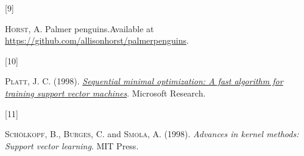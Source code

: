 \documentclass[
  11pt,
  letterpaper,
]{scrbook}
\newlength{\cslhangindent}
\newlength{\csllabelwidth}
\newlength{\cslentryspacingunit} %
\newenvironment{CSLReferences}[2] %
 {%
  \setlength{\parindent}{0pt}
  \ifodd #1
  \let\oldpar\par
  \def\par{\hangindent=\cslhangindent\oldpar}
  \fi
  \setlength{\parskip}{#2\cslentryspacingunit}
 }%
 {}
\newcommand{\CSLLeftMargin}[1]{\parbox[t]{\csllabelwidth}{#1}}
\newcommand{\CSLRightInline}[1]{\parbox[t]{\linewidth - \csllabelwidth}{#1}\break}
\theoremstyle{plain}
\theoremstyle{remark}
\begin{document}
\begin{CSLReferences}{0}{0}
\leavevmode{}%
\CSLLeftMargin{{[}9{]} }%
\CSLRightInline{\textsc{Horst}, A. Palmer penguins.Available at
\url{https://github.com/allisonhorst/palmerpenguins}.}

\leavevmode{}%
\CSLLeftMargin{{[}10{]} }%
\CSLRightInline{\textsc{Platt}, J. C. (1998).
\emph{\href{https://www-ai.cs.tu-dortmund.de/LEHRE/SEMINARE/SS09/AKTARBEITENDESDM/LITERATUR/PlattSMO.pdf}{Sequential
minimal optimization: A fast algorithm for training support vector
machines}}. Microsoft Research.}

\leavevmode{}%
\CSLLeftMargin{{[}11{]} }%
\CSLRightInline{\textsc{Schölkopf}, B., \textsc{Burges}, C. and
\textsc{Smola}, A. (1998). \emph{Advances in kernel methods: Support
vector learning}. MIT Press.}

\end{CSLReferences}


\backmatter
\end{document}
